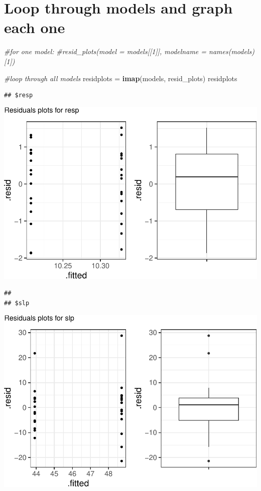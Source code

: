 \documentclass[]{article}
\newenvironment{Shaded}{\begin{snugshade}}{\end{snugshade}}
\newcommand{\KeywordTok}[1]{\textcolor[rgb]{0.13,0.29,0.53}{\textbf{#1}}}
\newcommand{\StringTok}[1]{\textcolor[rgb]{0.31,0.60,0.02}{#1}}
\newcommand{\CommentTok}[1]{\textcolor[rgb]{0.56,0.35,0.01}{\textit{#1}}}
\newcommand{\NormalTok}[1]{#1}
\begin{document}
\section{Loop through models and graph each
one}\label{loop-through-models-and-graph-each-one}

\begin{Shaded}
\begin{Highlighting}[]
\CommentTok{#for one model:}
\CommentTok{#resid_plots(model = models[[1]], modelname = names(models)[1])}

\CommentTok{#loop through all models}
\NormalTok{residplots =}\StringTok{ }\KeywordTok{imap}\NormalTok{(models, resid_plots)}
\NormalTok{residplots}
\end{Highlighting}
\end{Shaded}

\begin{verbatim}
## $resp
\end{verbatim}

\begin{center}\includegraphics{purr_map_demo_files/figure-latex/unnamed-chunk-6-1} \end{center}

\begin{verbatim}
## 
## $slp
\end{verbatim}

\begin{center}\includegraphics{purr_map_demo_files/figure-latex/unnamed-chunk-6-2} \end{center}
\end{document}
